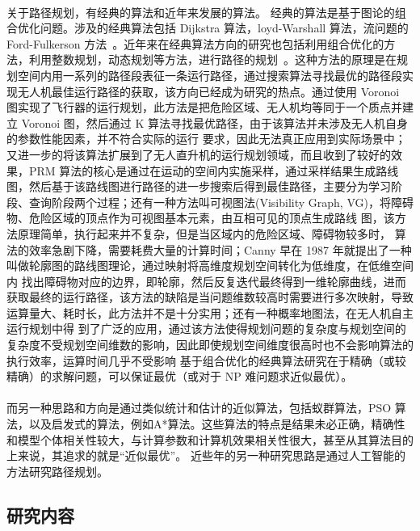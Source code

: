 \documentclass[UTF8,a4paper]{ctexart}
\begin{document}
\paragraph{}关于路径规划，有经典的算法和近年来发展的算法。 经典的算法是基于图论的组合优化问题。涉及的经典算法包括 Dijkstra 算法，loyd-Warshall 算法，流问题的 Ford-Fulkerson 方法~\cite{introtoalgo}。近年来在经典算法方向的研究也包括利用组合优化的方法，利用整数规划，动态规划等方法，进行路径的规划~\cite{introtoor}。这种方法的原理是在规划空间内用一系列的路径段表征一条运行路径，通过搜索算法寻找最优的路径段实现无人机最佳运行路径的获取，该方向已经成为研究的热点。通过使用 Voronoi 图实现了飞行器的运行规划，此方法是把危险区域、无人机均等同于一个质点并建立 Voronoi 图，然后通过 K 算法寻找最优路径，由于该算法并未涉及无人机自身的参数性能因素，并不符合实际的运行 要求，因此无法真正应用到实际场景中；又进一步的将该算法扩展到了无人直升机的运行规划领域，而且收到了较好的效果，PRM 算法的核心是通过在运动的空间内实施采样，通过采样结果生成路线图，然后基于该路线图进行路径的进一步搜索后得到最佳路径，主要分为学习阶段、查询阶段两个过程；还有一种方法叫可视图法(Visibility Graph, VG)，将障碍物、危险区域的顶点作为可视图基本元素，由互相可见的顶点生成路线 图，该方法原理简单，执行起来并不复杂，但是当区域内的危险区域、障碍物较多时， 算法的效率急剧下降，需要耗费大量的计算时间；Canny 早在 1987 年就提出了一种 叫做轮廓图的路线图理论，通过映射将高维度规划空间转化为低维度，在低维空间内 找出障碍物对应的边界，即轮廓，然后反复迭代最终得到一维轮廓曲线，进而获取最终的运行路径，该方法的缺陷是当问题维数较高时需要进行多次映射，导致运算量大、耗时长，此方法并不是十分实用；还有一种概率地图法，在无人机自主运行规划中得 到了广泛的应用，通过该方法使得规划问题的复杂度与规划空间的复杂度不受规划空间维数的影响，因此即使规划空间维度很高时也不会影响算法的执行效率，运算时间几乎不受影响 基于组合优化的经典算法研究在于精确（或较精确）的求解问题，可以保证最优（或对于 NP 难问题求近似最优）。
\paragraph{}而另一种思路和方向是通过类似统计和估计的近似算法，包括蚁群算法，PSO 算法，以及启发式的算法，例如A*算法。这些算法的特点是结果未必正确，精确性和模型个体相关性较大，与计算参数和计算机效果相关性很大，甚至从其算法目的上来说，其追求的就是“近似最优”。 近些年的另一种研究思路是通过人工智能的方法研究路径规划。

\subsection{研究内容}
\end{document}
